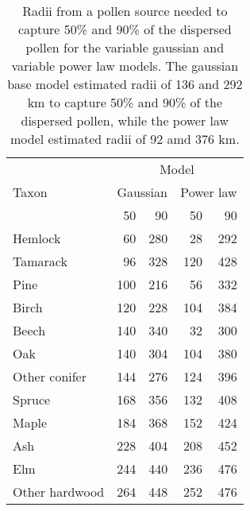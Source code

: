 \begin{table}
\begin{center}
\begin{tabular}{lrrrr} 
\toprule
      & \multicolumn{4}{c}{Model} \\  \cmidrule(lr){2-5}
Taxon & \multicolumn{2}{c}{Gaussian} & \multicolumn{2}{c}{Power law} \\  \cmidrule(lr){2-3}  \cmidrule(lr){4-5}
      & 50 & 90 & 50 & 90 \\
\cmidrule(lr){2-3}  \cmidrule(lr){4-5}
Hemlock        & 60  & 280 & 28  & 292 \\
Tamarack       &  96 & 328 & 120 & 428 \\
Pine           & 100 & 216 & 56  & 332 \\
Birch          & 120 & 228 & 104 & 384 \\
Beech          & 140 & 340 & 32  & 300 \\
Oak            & 140 & 304 & 104 & 380 \\
Other conifer  & 144 & 276 & 124 & 396 \\ 
Spruce         & 168 & 356 & 132 & 408 \\
Maple          & 184 & 368 & 152 & 424 \\
Ash            & 228 & 404 & 208 & 452 \\
Elm            & 244 & 440 & 236 & 476 \\
Other hardwood & 264 & 448 & 252 & 476 \\
 \bottomrule
\end{tabular}
\caption{Radii from a pollen source needed to capture 50\% and 90\% of
  the dispersed pollen for the variable gaussian and variable power
  law models. The gaussian base model estimated radii of 136 and 292
  km to capture 50\% and 90\% of the dispersed pollen, while the power
  law model estimated radii of 92 amd 376 km.}
\end{center}
\label{table:pollen_acc}
\vspace{2cm}
\end{table}